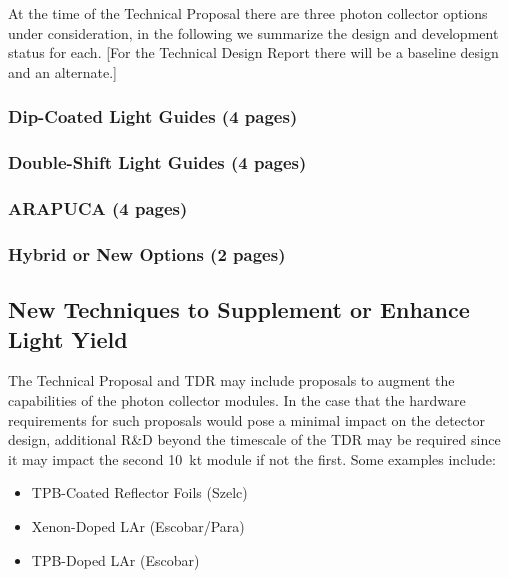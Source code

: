 At the time of the Technical Proposal there are three photon collector options  under consideration, in the following we summarize the design and development status for each. [For the Technical Design Report there will be a baseline design and an alternate.]

\subsubsection{Dip-Coated Light Guides (4 pages)}
\label{ssec:fdsp-pd-pc-bar1}

\subsubsection{Double-Shift Light Guides (4 pages)}
\label{ssec:fdsp-pd-pc-bar2}

\subsubsection{ARAPUCA (4 pages)}
\label{ssec:fdsp-pd-pc-arapuca}

\subsubsection{Hybrid or New Options (2 pages)}
\label{ssec:fdsp-pd-pc-new}

\subsection{New Techniques to Supplement or Enhance Light Yield}
\label{sec:fdsp-pd-enh}

The Technical Proposal and TDR may include proposals to augment the capabilities of the photon
collector modules. In the case that the hardware requirements for such proposals would pose a minimal
impact on the detector design, additional R\&D beyond the timescale of the TDR may be required since it may impact the second 10~kt module if not the first. 
Some examples include:
\begin{itemize}
\item TPB-Coated Reflector Foils (Szelc)
\item Xenon-Doped LAr (Escobar/Para)
\item TPB-Doped LAr (Escobar)
\end{itemize}

